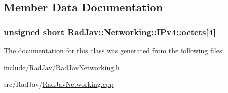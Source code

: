 \subsection{Member Data Documentation}
\subsubsection[{\texorpdfstring{octets}{octets}}]{\setlength{\rightskip}{0pt plus 5cm}unsigned short Rad\+Jav\+::\+Networking\+::\+I\+Pv4\+::octets\mbox{[}4\mbox{]}\hspace{0.3cm}{\ttfamily [protected]}}\hypertarget{class_rad_jav_1_1_networking_1_1_i_pv4_a991c5446a73e2c168f3408c129a41605}{}\label{class_rad_jav_1_1_networking_1_1_i_pv4_a991c5446a73e2c168f3408c129a41605}


The documentation for this class was generated from the following files\+:\begin{DoxyCompactItemize}
\item 
include/\+Rad\+Jav/\hyperlink{_rad_jav_networking_8h}{Rad\+Jav\+Networking.\+h}\item 
src/\+Rad\+Jav/\hyperlink{_rad_jav_networking_8cpp}{Rad\+Jav\+Networking.\+cpp}\end{DoxyCompactItemize}
